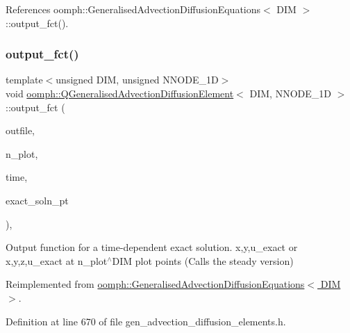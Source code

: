 References oomph\+::\+Generalised\+Advection\+Diffusion\+Equations$<$ D\+I\+M $>$\+::output\+\_\+fct().

\mbox{\label{classoomph_1_1QGeneralisedAdvectionDiffusionElement_ab8bec1be15a037df4628282d01ca57a7}} 
\subsubsection{\texorpdfstring{output\+\_\+fct()}{output\_fct()}\hspace{0.1cm}{\footnotesize\ttfamily [2/2]}}
{\footnotesize\ttfamily template$<$unsigned D\+IM, unsigned N\+N\+O\+D\+E\+\_\+1D$>$ \\
void \hyperlink{classoomph_1_1QGeneralisedAdvectionDiffusionElement}{oomph\+::\+Q\+Generalised\+Advection\+Diffusion\+Element}$<$ D\+IM, N\+N\+O\+D\+E\+\_\+1D $>$\+::output\+\_\+fct (\begin{DoxyParamCaption}\item[{std\+::ostream \&}]{outfile,  }\item[{const unsigned \&}]{n\+\_\+plot,  }\item[{const double \&}]{time,  }\item[{\hyperlink{classoomph_1_1FiniteElement_ad4ecf2b61b158a4b4d351a60d23c633e}{Finite\+Element\+::\+Unsteady\+Exact\+Solution\+Fct\+Pt}}]{exact\+\_\+soln\+\_\+pt }\end{DoxyParamCaption})\hspace{0.3cm}{\ttfamily [inline]}, {\ttfamily [virtual]}}



Output function for a time-\/dependent exact solution. x,y,u\+\_\+exact or x,y,z,u\+\_\+exact at n\+\_\+plot$^\wedge$\+D\+IM plot points (Calls the steady version) 



Reimplemented from \hyperlink{classoomph_1_1GeneralisedAdvectionDiffusionEquations_a41914c83c67c4de8d2d504c918e04872}{oomph\+::\+Generalised\+Advection\+Diffusion\+Equations$<$ D\+I\+M $>$}.



Definition at line 670 of file gen\+\_\+advection\+\_\+diffusion\+\_\+elements.\+h.



